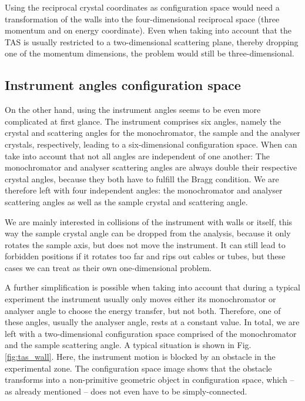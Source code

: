 Using the reciprocal crystal coordinates as configuration space would need a transformation of the walls into the four-dimensional reciprocal space (three momentum and on energy coordinate). Even when taking into account that the TAS is usually restricted
to a two-dimensional scattering plane, thereby dropping one of the momentum dimensions, the problem would still be 
three-dimensional.

\subsection*{Instrument angles configuration space}
On the other hand, using the instrument angles seems to be even more complicated at first glance. The instrument comprises
six angles, namely the crystal and scattering angles for the monochromator, the sample and the analyser crystals, respectively,
leading to a six-dimensional configuration space. When can take into account that not all angles are independent of one another:
The monochromator and analyser scattering angles are always double their respective crystal angles, because they both
have to fulfill the Bragg condition. We are therefore left with four independent angles: the monochromator and analyser 
scattering angles as well as the sample crystal and scattering angle. 

We are mainly interested in collisions of the instrument with walls or itself, this way the sample crystal angle can be dropped 
from the analysis, because it only rotates the sample axis, but does not move the instrument. It can still lead to forbidden 
positions if it rotates too far and rips out cables or tubes, but these cases we can treat as their own one-dimensional problem. 

A further simplification is possible when taking into account that during a typical experiment the instrument usually only moves 
either its monochromator or analyser angle to choose the energy transfer, but not both. Therefore, one of these angles, 
usually the analyser angle, rests at a constant value. In total, we are left with a two-dimensional configuration space comprised 
of the monochromator and the sample scattering angle. A typical situation is shown in Fig. \ref{fig:tas_wall}. Here, the instrument 
motion is blocked by an obstacle in the experimental zone. The configuration space image shows that the obstacle transforms
into a non-primitive geometric object in configuration space, which -- as already mentioned -- does not even have to be simply-connected.

